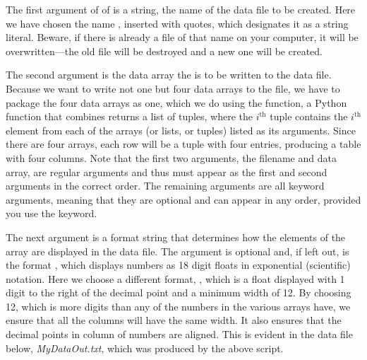 \documentclass[letterpaper,10pt,english]{sphinxmanual}
\begin{document}
The first argument of of  is a string, the name of the data file to be created.  Here we have chosen the name , inserted with quotes, which designates it as a string literal.  Beware, if there is already a file of that name on your computer, it will be overwritten---the old file will be destroyed and a new one will be created.

The second argument is the data array the is to be written to the data file.  Because we want to write not one but four data arrays to the file, we have to package the four data arrays as one, which we do using the  function, a Python function that combines returns a list of tuples, where the $i^\mathrm{th}$ tuple contains the $i^\mathrm{th}$ element from each of the arrays (or lists, or tuples) listed as its arguments.  Since there are four arrays, each row will be a tuple with four entries, producing a table with four columns.  Note that the first two arguments, the filename and data array, are regular arguments and thus must appear as the first and second arguments in the correct order.  The remaining arguments are all keyword arguments, meaning that they are optional and can appear in any order, provided you use the keyword.

The next argument is a format string that determines how the elements of the array are displayed in the data file.  The argument is optional and, if left out, is the format , which displays numbers as 18 digit floats in exponential (scientific) notation.  Here we choose a different format, , which is a float displayed with 1 digit to the right of the decimal point and a minimum width of 12.  By choosing 12, which is more digits than any of the numbers in the various arrays have, we ensure that all the columns will have the same width.  It also ensures that the decimal points in column of numbers are aligned.   This is evident in the data file below, \emph{MyDataOut.txt}, which was produced by the above script.
\end{document}
